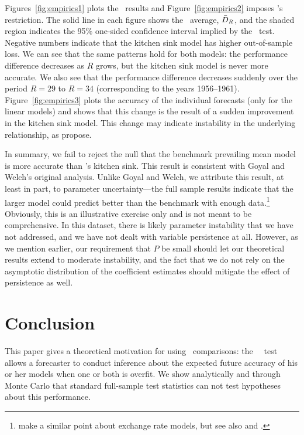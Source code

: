 \documentclass[11pt]{article}
\newcommand{\citepos}[1]{\citeauthor{#1}'s \citeyearpar{#1}}
\begin{document}
Figures~\ref{fig:empirics1} plots the \ols\ results and
Figure~\ref{fig:empirics2} imposes \citepos{CaT:08} restriction.  The
solid line in each figure shows the \oos\ average, $\bar{D}_{R}$, and the
shaded region indicates the 95\% one-sided confidence interval implied
by the \dmw\ test.  Negative numbers indicate that the kitchen sink
model has higher out-of-sample loss.  We can see that the same
patterns hold for both models: the performance difference decreases as
$R$ grows, but the kitchen sink model is never more accurate.  We also
see that the performance difference decreases suddenly over the period
$R=29$ to $R=34$ (corresponding to the years 1956--1961).
Figure~\ref{fig:empirics3} plots the accuracy of the individual
forecasts (only for the linear models) and shows that this change is
the result of a sudden improvement in the kitchen sink model.  This
change may indicate instability in the underlying relationship, as
\citet{GoW:08} propose.

In summary, we fail to reject the null that the benchmark prevailing
mean model is more accurate than \citepos{GoW:08} kitchen sink.  This
result is consistent with Goyal and Welch's original analysis.  Unlike
Goyal and Welch, we attribute this result, at least in part, to
parameter uncertainty---the full sample results indicate that the
larger model could predict better than the benchmark with enough
data.\footnote{\citet{BWB:10} make a similar point about exchange rate
models, but see also \citet{Chi:10} and \citet{Gia:10}.}
Obviously, this is an illustrative exercise only and is not meant to
be comprehensive.  In this dataset, there is likely parameter
instability that we have not addressed, and we have not dealt with
variable persistence at all.  However, as we mention earlier, our
requirement that $P$ be small should let our theoretical results
extend to moderate instability, and the fact that we do not rely on
the asymptotic distribution of the coefficient estimates should
mitigate the effect of persistence as well.
\section{Conclusion}\label{sec:conclusion}
This paper gives a theoretical motivation for using \oos\ comparisons:
the \dmw\ \oos\ test allows a forecaster to conduct inference about
the expected future accuracy of his or her models when one or both is
overfit.  We show analytically and through Monte Carlo that standard
full-sample test statistics can not test hypotheses about this
performance.
\end{document}
